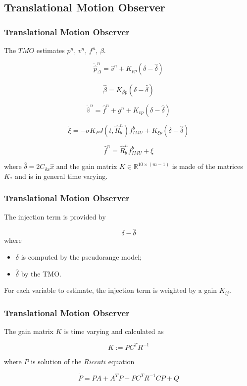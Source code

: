 \documentclass{beamer}
\begin{document}
\subsection{Translational Motion Observer}

	\begin{frame}
		\frametitle{Translational Motion Observer}
		The $TMO$ estimates $p^n$, $v^n$, $f^n$, $\beta$.
		
		\[ \dot{\hat{p}}^n_\Delta = \hat{v}^n + K_{pp}(\delta - \hat{\delta})  \]
		
		\[ \dot{\hat{\beta}} = K_{\beta p} (\delta - \hat{\delta}) \]
		
		\[ \dot{\hat{v}}^n = \hat{f}^n + g^n + K_{vp}(\delta - \hat{\delta})\]
		
		\[ \dot{\xi} = - \sigma K_P J(t, \hat{R}^n_b)f^b_{IMU} + K_{\xi p}(\delta - \hat{\delta}) \]
		
		\[ \hat{f}^n = \hat{R}^n_b f^b_{IMU} + \xi  \]
		
		where $\hat{\delta} = 2C_{\delta x}\hat{x}$ and the gain matrix $K \in \mathds{R}^{10\times(m-1)}$ is made of the matrices $K_*$ and is in general time varying.
	\end{frame}

	\begin{frame}
		\frametitle{Translational Motion Observer}
		The injection term is provided by
		
		\[  \delta - \hat{\delta} \]
		where
		\begin{itemize}
			\item $\delta$ is computed by the pseudorange model;
			\item $\hat{\delta}$ by the TMO.
		\end{itemize}
	
	For each variable to estimate, the injection term is weighted by a gain $K_{ij}$.		
	\end{frame}

	\begin{frame}
		\frametitle{Translational Motion Observer}
		The gain matrix $K$ is time varying and calculated as
		
		\[ K := PC^TR^{-1} \]
		
		where $P$ is solution of the $Riccati$ equation
		
		\[ \dot{P} = PA + A^TP - PC^TR^{-1}CP + Q\]
	\end{frame}

		
\end{document}
